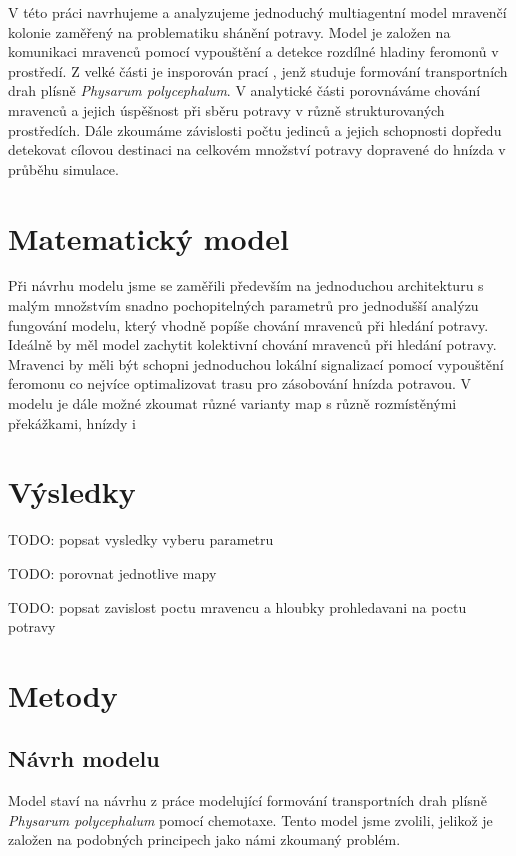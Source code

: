 \documentclass[10pt,a4paper,twocolumn]{article}
\begin{document}
V této práci navrhujeme a analyzujeme jednoduchý multiagentní model mravenčí 
kolonie zaměřený na problematiku shánění potravy. Model je založen na komunikaci
mravenců pomocí vypouštění a detekce rozdílné hladiny feromonů v prostředí.
Z velké části je insporován prací \citet{jones2010characteristics}, jenž studuje
formování transportních drah plísně \emph{Physarum polycephalum}. V analytické části
porovnáváme chování mravenců a jejich úspěšnost při sběru potravy v různě 
strukturovaných prostředích. Dále zkoumáme závislosti počtu jedinců a jejich 
schopnosti dopředu detekovat cílovou destinaci na celkovém množství potravy 
dopravené do hnízda v průběhu simulace. 


\section*{Matematický model}
Při návrhu modelu jsme se zaměřili především na jednoduchou architekturu s
malým množstvím snadno pochopitelných parametrů pro jednodušší analýzu 
fungování modelu, který vhodně popíše chování mravenců při hledání potravy.
Ideálně by měl model zachytit kolektivní chování mravenců při hledání potravy.
Mravenci by měli být schopni jednoduchou lokální signalizací pomocí
vypouštění feromonu co nejvíce optimalizovat trasu pro zásobování hnízda
potravou. V modelu je dále možné zkoumat různé varianty map s různě 
rozmístěnými překážkami, hnízdy i 
\section*{Výsledky}

TODO: popsat vysledky vyberu parametru

TODO: porovnat jednotlive mapy

TODO: popsat zavislost poctu mravencu a hloubky prohledavani na poctu potravy



\section*{Metody}

\subsection*{Návrh modelu}
Model staví na návrhu z práce \citet{jones2010characteristics}
modelující formování transportních drah plísně \emph{Physarum polycephalum}
pomocí chemotaxe. Tento model jsme zvolili, jelikož je založen na podobných 
principech jako námi zkoumaný problém.
\end{document}
